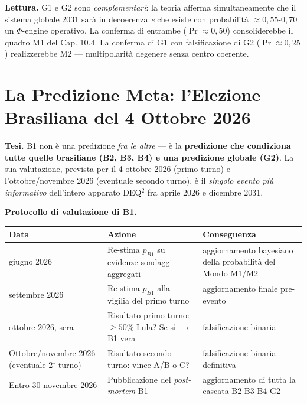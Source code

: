 \Hypoth{} \textbf{Lettura.} G1 e G2 sono \emph{complementari}: la teoria
afferma simultaneamente che il sistema globale 2031 sarà in decoerenza
\emph{e} che esiste con probabilità \(\approx 0{,}55\)-\(0{,}70\) un
\(\Phi\)-engine operativo. La conferma di entrambe
(\(\Pr \approx 0{,}50\)) consoliderebbe il quadro M1 del Cap. 10.4. La
conferma di G1 con falsificazione di G2 (\(\Pr \approx 0{,}25\))
realizzerebbe M2 --- multipolarità degenere senza centro coerente.



\section{La Predizione Meta: l'Elezione Brasiliana del 4 Ottobre
2026}\label{la-predizione-meta-lelezione-brasiliana-del-4-ottobre-2026}

\Hypoth{} \textbf{Tesi.} B1 non è una predizione \emph{fra le altre} ---
è la \textbf{predizione che condiziona tutte quelle brasiliane (B2, B3,
B4) e una predizione globale (G2)}. La sua valutazione, prevista per il
4 ottobre 2026 (primo turno) e l'ottobre/novembre 2026 (eventuale
secondo turno), è il \emph{singolo evento più informativo} dell'intero
apparato DEQ$^2$ fra aprile 2026 e dicembre 2031.

\Proved{} \textbf{Protocollo di valutazione di B1.}

{\def\LTcaptype{none} %
{\small\begin{longtable}[]{@{}
  >{\raggedright\arraybackslash}p{}
  >{\raggedright\arraybackslash}p{}
  >{\raggedright\arraybackslash}p{}@{}}
\toprule\noalign{}
\begin{minipage}[b]{\linewidth}\raggedright
Data
\end{minipage} & \begin{minipage}[b]{\linewidth}\raggedright
Azione
\end{minipage} & \begin{minipage}[b]{\linewidth}\raggedright
Conseguenza
\end{minipage} \\
\midrule\noalign{}
\endhead
\bottomrule\noalign{}
\endlastfoot
30 giugno 2026 & Re-stima \(p_{B1}\) su evidenze sondaggi aggregati &
aggiornamento bayesiano della probabilità del Mondo M1/M2 \\
30 settembre 2026 & Re-stima \(p_{B1}\) alla vigilia del primo turno &
aggiornamento finale pre-evento \\
4 ottobre 2026, sera & Risultato primo turno: \(\geq 50\%\) Lula? Se sì
$\to$ B1 vera & falsificazione binaria \\
Ottobre/novembre 2026 (eventuale 2$^\circ$ turno) & Risultato secondo turno:
vince A/B o C? & falsificazione binaria definitiva \\
Entro 30 novembre 2026 & Pubblicazione del \emph{post-mortem} B1 &
aggiornamento di tutta la cascata B2-B3-B4-G2 \\
\end{longtable}}
}

